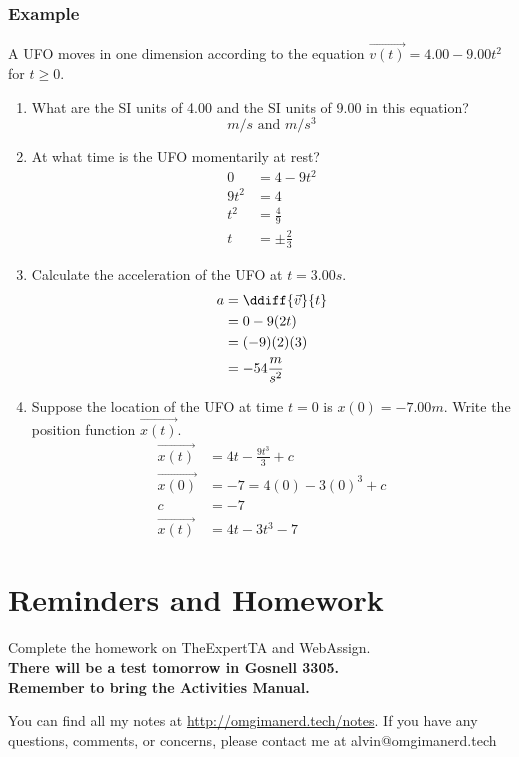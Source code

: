 \documentclass[letterpaper, 12pt]{math}
\begin{document}
\subsubsection*{Example}
A UFO moves in one dimension according to the equation \( \overrightarrow{v(t)}
= 4.00-9.00t^2 \) for \( t\ge 0 \).
\begin{enumerate}
  \item What are the SI units of 4.00 and the SI units of 9.00 in this equation?
  \[ m/s \text{ and } m/s^3 \]
  \item At what time is the UFO momentarily at rest?
  \begin{align*}
    0 &= 4-9t^2 \\
    9t^2 &= 4 \\
    t^2 &= \frac{4}{9} \\
    t &= \pm\frac{2}{3}
  \end{align*}
  \item Calculate the acceleration of the UFO at \( t = 3.00s \).
  \begin{align*}
    a &= \ddiff{\vec{v}}{t} \\
    &= 0-9(2t) \\
    &= (-9)(2)(3) \\
    &= -54\frac{m}{s^2}
  \end{align*}
  \item Suppose the location of the UFO at time \( t = 0 \) is \( x(0) = -7.00m
  \). Write the position function \( \overrightarrow{x(t)} \).
  \begin{align*}
    \overrightarrow{x(t)} &= 4t-\frac{9t^3}{3}+c \\
    \overrightarrow{x(0)} &= -7 = 4(0)-3(0)^3+c \\
    c &= -7 \\
    \overrightarrow{x(t)} &= 4t-3t^3-7
  \end{align*}
\end{enumerate}

\section*{Reminders and Homework}
Complete the homework on TheExpertTA and WebAssign. \\
\textbf{There will be a test tomorrow in Gosnell 3305.} \\
\textbf{Remember to bring the Activities Manual.} \\

\begin{center}
  You can find all my notes at \url{http://omgimanerd.tech/notes}. If you have
  any questions, comments, or concerns, please contact me at
  alvin@omgimanerd.tech
\end{center}
\end{document}
